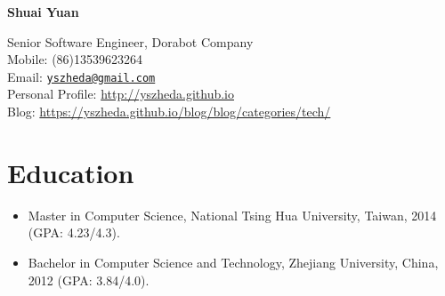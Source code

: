 \documentclass[letterpaper]{article}
\def\name{Shuai Yuan}
\begin{document}
\centerline{\huge\bf \name} \vspace{0.25in}
\begin{minipage}[t]{0.8\textwidth}
    Senior Software Engineer, Dorabot Company \\
    Mobile: (86)13539623264   \\
    Email: \href{mailto:yszheda@gmail.com}{\tt yszheda@gmail.com}\\
    Personal Profile: \url{http://yszheda.github.io} \\
    Blog: \url{https://yszheda.github.io/blog/blog/categories/tech/}
\end{minipage}

\section*{Education}
\begin{itemize}
    \item Master in Computer Science, National Tsing Hua University, Taiwan, 2014 (GPA: 4.23/4.3).
    \item Bachelor in Computer Science and Technology, Zhejiang University, China, 2012 (GPA: 3.84/4.0).
\end{itemize}
\end{document}
